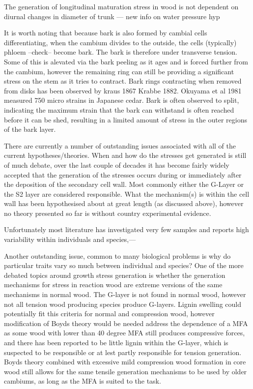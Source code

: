 \documentclass{article}
\begin{document}
The generation of longitudinal maturation stress in wood is not dependent on
diurnal changes in diameter of trunk --- new info on water pressure hyp


It is worth noting that because bark is also formed by cambial cells
differentiating, when the cambium divides to the outside, the cells (typically)
phloem --check-- become bark. The bark is therefore under transverse tension.
Some of this is alevated via the bark peeling as it ages and is forced further
from the cambium, however the remaining ring can still be providing a
significant stress on the stem as it tries to contract. Bark rings contracting
when removed from disks has been observed by kraus 1867 Krabbe 1882. Okuyama et
al 1981 measured 750 micro strains in Japanese cedar. Bark is often observed to
split, indicating the maximum strain that the bark can withstand is often
reached before it can be shed, resulting in a limited amount of stress in the
outer regions of the bark layer.

There are currently a number of outstanding issues associated with all
of the current hypotheses/theories. When and how do the stresses get
generated is still of much debate, over the last couple of decades it has become
fairly widely accepted that the generation of the stresses occurs during or
immediately after the deposition of the secondary cell wall. Most commonly either
the G-Layer or the S2 layer are considered responsible. What the mechanism(s)
is within the cell wall has been hypothesised about at great length (as
discussed above), however no theory presented so far is without country
experimental evidence.

Unfortunately most literature has investigated very few samples and reports high
variability within individuals and species,---

Another outstanding issue, common to many biological problems is why do
particular traits vary so much between individual and species? One of the
more debated topics around growth stress generation is whether the generation
mechanisms for stress in reaction wood are extreme versions of the same
mechanisms in normal wood. The G-layer is not found in normal wood, however not
all tension wood producing species produce G-layers. Lignin swelling could
potentially fit this criteria for normal and compression wood, however
modification of Boyds theory would be needed address the dependence of a MFA
as some wood with lower than 40 degree MFA still produces compressive forces,
and there has been reported to be little lignin within the G-layer, which is
suspected to be responsible or at lest partly responsible for tension
generation. Boyds theory combined with excessive mild compression wood
formation in core wood still allows for the same tensile generation mechanisms
to be used by older cambiums, as long as the MFA is suited to the task.
\end{document}
